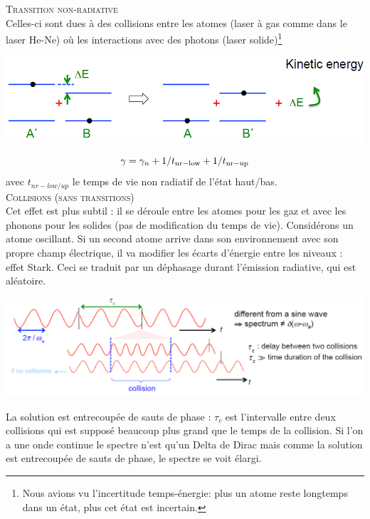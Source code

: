 	 \textsc{Transition non-radiative}\\
	 Celles-ci sont dues à des collisions entre les atomes (laser à gas comme dans le laser
	 He-Ne) où les interactions avec des photons (laser solide)\footnote{Nous avions vu l'incertitude 
	 temps-énergie: plus un atome reste longtemps dans un état, plus cet état est incertain.}
	 \begin{center}
 	\includegraphics[scale=0.5]{ch2/image19.png}
	 \end{center}
	 \begin{equation}
	\gamma  = {\gamma _n} + 1/{t_{{\rm{nr - low}}}} + 1/{t_{{\rm{nr - up}}}}
	 \end{equation}
	 avec $t_{nr-low/up}$ le temps de vie non radiatif de l'état haut/bas.\\
	 
	 \textsc{Collisions (sans transitions)}\\
	 Cet effet est plus subtil : il se déroule entre les atomes pour les gaz et avec les 
	 phonons pour les solides (pas de modification du temps de vie). Considérons un atome
	 oscillant. Si un second atome arrive dans son environnement avec son propre champ électrique, 
	 il va modifier les écarts d'énergie entre les niveaux : effet Stark. Ceci se traduit par un 
	 déphasage durant l'émission radiative, qui est aléatoire. 
	 
	 	 \begin{center}
 	\includegraphics[scale=0.45]{ch2/image20.png}
	 \end{center}
	 
	 La solution est entrecoupée de sauts de phase : $\tau_c$ est l'intervalle entre deux collisions 
	 qui est supposé beaucoup plus grand que le temps de la collision. 
	 Si l'on a une onde continue le spectre n'est qu'un Delta de Dirac mais comme la solution est 
	 entrecoupée de sauts de phase, le spectre se voit élargi.\\
	 
